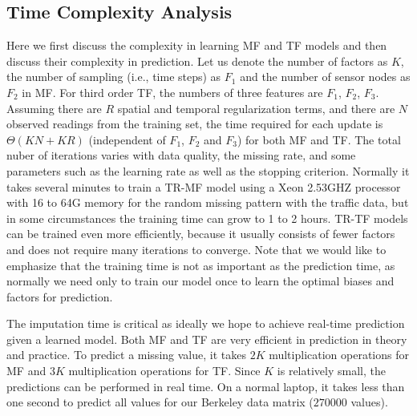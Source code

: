 %
%


\subsection{Time Complexity Analysis}
Here we first discuss the complexity in learning MF and TF models and then discuss their complexity in prediction.
Let us denote the number of factors as $K$, the number of sampling (i.e., time steps) as $F_1$ and the number of sensor nodes as $F_2$ in MF.
For third order TF, the numbers of three features are $F_1$, $F_2$, $F_3$.  
Assuming there are $R$ spatial and temporal regularization terms, and there are $N$ observed readings from the training set, the time required for each update is $\Theta(KN + KR)$ (independent of $F_1$, $F_2$ and $F_3$) for both MF and TF.
The total nuber of iterations varies with data quality, the missing rate, and some parameters such as the learning rate as well as the stopping criterion.
Normally it takes several minutes to train a TR-MF model using a Xeon 2.53GHZ processor with 16 to 64G memory for the random missing pattern with the traffic data, but in some circumstances the training time can grow to 1 to 2 hours.
TR-TF models can be trained even more efficiently, because it usually consists of fewer factors and does not require many iterations to converge. 
Note that we would like to emphasize that the training time is not as important as the prediction time, as normally we need only to train our model once to learn the optimal biases and factors for prediction.

The imputation time is critical as ideally we hope to achieve real-time prediction given a learned model. 
Both MF and TF are very efficient in prediction in theory and practice.
To predict a missing value, it takes $2K$ multiplication operations for MF and $3K$ multiplication operations for TF.
Since $K$ is relatively small, the predictions can be performed in real time.
On a normal laptop, it takes less than one second to predict all values for our Berkeley data matrix ($270000$ values).


